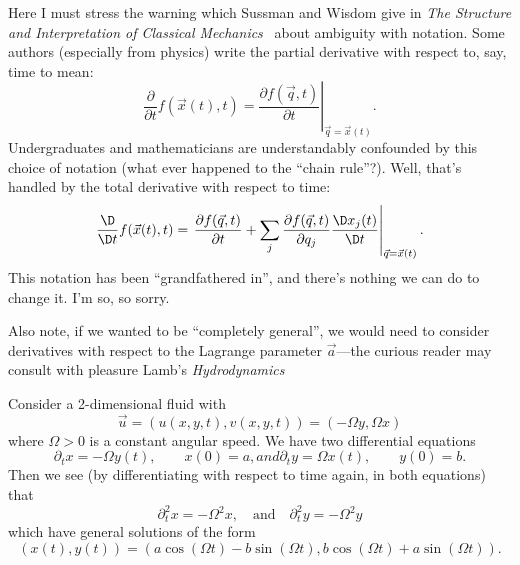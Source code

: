 \begin{node}
\begin{node}\label{fluids:describing-0007}%
Here I must stress the warning which Sussman and Wisdom give in
\textit{The Structure and Interpretation of Classical Mechanics}~\cite{sicm}
about ambiguity with notation. Some authors (especially from physics)
write the partial derivative with respect to, say, time to mean:
\begin{equation}
  \frac{\partial}{\partial t}f(\vec{x}(t), t)
  = \left.\frac{\partial f(\vec{q}, t)}{\partial t}\right|_{\vec{q}=\vec{x}(t)}.
\end{equation}
Undergraduates and mathematicians are understandably confounded by this
choice of notation (what ever happened to the ``chain rule''?). Well,
that's handled by the total derivative with respect to time:
\begin{equation}
\frac{\D}{\D t}f(\vec{x}(t), t)
= \left.\frac{\partial f(\vec{q}, t)}{\partial t}
  + \sum_{j}\frac{\partial f(\vec{q},t)}{\partial q_{j}}\frac{\D x_{j}(t)}{\D t}\right|_{\vec{q}=\vec{x}(t)}.
\end{equation}
This notation has been ``grandfathered in'', and there's nothing we can
do to change it. I'm so, so sorry.
\end{node}
\begin{node}\label{fluids:describing-0008}%
Also note, if we wanted to be ``completely general'', we would need to
consider derivatives with respect to the Lagrange parameter
$\vec{a}$---the curious reader may consult with pleasure Lamb's \textit{Hydrodynamics}~\cite[\S\S13--14]{lamb1945hydrodynamics}
\end{node}
\end{node}

\begin{example}
Consider a 2-dimensional fluid with
\begin{equation*}
\vec{u}=(u(x,y,t), v(x,y,t))=(-\Omega y,\Omega x)
\end{equation*}
where $\Omega>0$ is a constant angular speed. We have two differential
equations
\begin{subequations}
\begin{equation}
\partial_{t}x = -\Omega y(t),\qquad x(0)=a,
\end{equation}
and
\begin{equation}
\partial_{t}y = \Omega x(t),\qquad y(0)=b.
\end{equation}
\end{subequations}
Then we see (by differentiating with respect to time again, in both
equations) that 
\begin{equation*}
\partial_{t}^{2}x = -\Omega^{2}x,\quad\mbox{and}\quad\partial_{t}^{2}y=-\Omega^{2}y
\end{equation*}
which have general solutions of the form
\begin{equation}
(x(t),y(t)) = (a\cos(\Omega t)-b\sin(\Omega t), b\cos(\Omega t) + a\sin(\Omega t)).
\end{equation}
\end{example}

